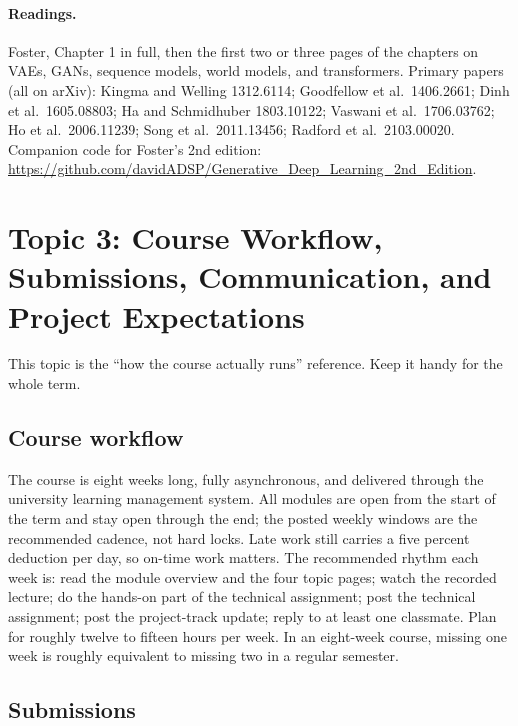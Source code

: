 \documentclass[11pt]{article}
\theoremstyle{remark}
\begin{document}
\paragraph{Readings.} Foster, Chapter 1 in full, then the first two or three pages of the chapters on VAEs, GANs, sequence models, world models, and transformers. Primary papers (all on arXiv): Kingma and Welling 1312.6114; Goodfellow et al.\ 1406.2661; Dinh et al.\ 1605.08803; Ha and Schmidhuber 1803.10122; Vaswani et al.\ 1706.03762; Ho et al.\ 2006.11239; Song et al.\ 2011.13456; Radford et al.\ 2103.00020. Companion code for Foster's 2nd edition: \url{https://github.com/davidADSP/Generative_Deep_Learning_2nd_Edition}.

\section{Topic 3: Course Workflow, Submissions, Communication, and Project Expectations}

This topic is the ``how the course actually runs'' reference. Keep it handy for the whole term.

\subsection{Course workflow}

The course is eight weeks long, fully asynchronous, and delivered through the university learning management system. All modules are open from the start of the term and stay open through the end; the posted weekly windows are the recommended cadence, not hard locks. Late work still carries a five percent deduction per day, so on-time work matters. The recommended rhythm each week is: read the module overview and the four topic pages; watch the recorded lecture; do the hands-on part of the technical assignment; post the technical assignment; post the project-track update; reply to at least one classmate. Plan for roughly twelve to fifteen hours per week. In an eight-week course, missing one week is roughly equivalent to missing two in a regular semester.

\subsection{Submissions}
\end{document}
